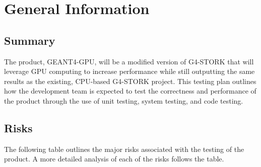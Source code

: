 \documentclass[12pt]{article}
\begin{document}
\section{General Information}

\subsection{Summary} %
The product, GEANT4-GPU, will be a modified version of G4-STORK that will leverage GPU computing to increase performance while still outputting the same results as the existing, CPU-based G4-STORK project. This testing plan outlines how the development team is expected to test the correctness and performance of the product through the use of unit testing, system testing, and code testing.

\newpage
\subsection{Risks} %
The following table outlines the major risks associated with the testing of the product. A more detailed analysis of each of the risks follows the table.
\end{document}
